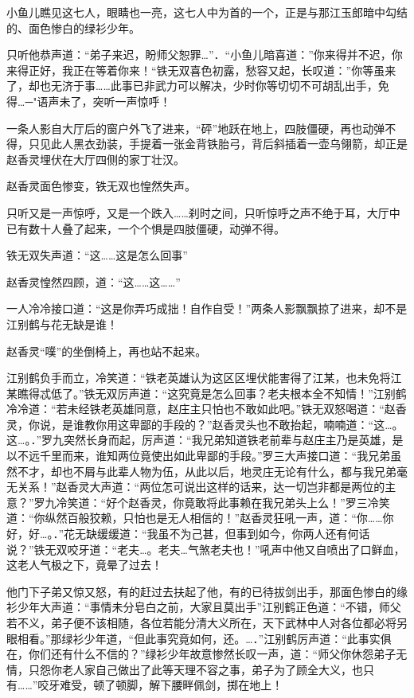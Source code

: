 \documentclass[12pt,oneside]{book}
\begin{document}
小鱼儿瞧见这七人，眼睛也一亮，这七人中为首的一个，正是与那江玉郎暗中勾结的、面色惨白的绿衫少年。

只听他恭声道：``弟子来迟，盼师父恕罪\ldots{}''．``小鱼儿暗喜道：''你来得并不迟，你来得正好，我正在等着你来！``铁无双喜色初露，愁容又起，长叹道：''你等虽来了，却也无济于事\ldots\ldots 此事已非武力可以解决，少时你等切切不可胡乱出手，免得\ldots─"语声未了，突听一声惊呼！

一条人影自大厅后的窗户外飞了进来，``砰''地跃在地上，四肢僵硬，再也动弹不得，只见此人黑衣劲装，手提着一张金背铁胎弓，背后斜插着一壶乌翎箭，却正是赵香灵埋伏在大厅四侧的家丁壮汉。

赵香灵面色惨变，铁无双也惶然失声。

只听又是一声惊呼，又是一个跌入\ldots\ldots 刹时之间，只听惊呼之声不绝于耳，大厅中已有数十人叠了起来，一个个惧是四肢僵硬，动弹不得。

铁无双失声道：``这\ldots\ldots 这是怎么回事''

赵香灵惶然四顾，道：``这\ldots\ldots 这\ldots\ldots{}''

一人冷冷接口道：``这是你弄巧成拙！自作自受！''两条人影飘飘掠了进来，却不是江别鹤与花无缺是谁！

赵香灵``噗''的坐倒椅上，再也站不起来。

江别鹤负手而立，冷笑道：``铁老英雄认为这区区埋伏能害得了江某，也未免将江某瞧得忒低了。''铁无双厉声道：``这究竟是怎么回事？老夫根本全不知情！''江别鹤冷冷道：``若未经铁老英雄同意，赵庄主只怕也不敢如此吧。''铁无双怒喝道：``赵香灵，你说，是谁教你用这卑鄙的手段的？''赵香灵头也不敢抬起，喃喃道：``这\ldots。这\ldots。．''罗九突然长身而起，厉声道：``我兄弟知道铁老前辈与赵庄主乃是英雄，是以不远千里而来，谁知两位竟使出如此卑鄙的手段。''罗三大声接口道：``我兄弟虽然不才，却也不屑与此辈人物为伍，从此以后，地灵庄无论有什么，都与我兄弟毫无关系！''赵香灵大声道：``两位怎可说出这样的话来，达一切岂非都是两位的主意？''罗九冷笑道：``好个赵香灵，你竟敢将此事赖在我兄弟头上么！''罗三冷笑道：``你纵然百般狡赖，只怕也是无人相信的！''赵香灵狂吼一声，道：``你\ldots\ldots 你好，好\ldots。．''花无缺缓缓道：``我虽不为己甚，但事到如今，你两人还有何话说？''铁无双咬牙道：``老夫\ldots。老夫\ldots 气煞老夫也！''吼声中他又自喷出了口鲜血，这老人气极之下，竟晕了过去！

他门下子弟又惊又怒，有的赶过去扶起了他，有的已待拔剑出手，那面色惨白的缘衫少年大声道：``事情未分皂白之前，大家且莫出手''江别鹤正色道：``不错，师父若不义，弟子便不该相随，各位若能分清大义所在，天下武林中人对各位都必将另眼相看。''那绿衫少年道，``但此事究竟如何，还。\ldots．''江别鹤厉声道：``此事实俱在，你们还有什么不信的？''绿衫少年故意惨然长叹一声，道：``师父你休怨弟子无情，只怨你老人家自己做出了此等天理不容之事，弟子为了顾全大义，也只有\ldots\ldots{}''咬牙难受，顿了顿脚，解下腰畔佩剑，掷在地上！
\end{document}
